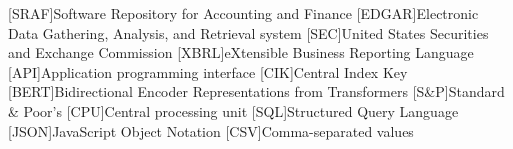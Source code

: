 \begin{acronym}[EDGAR]
    [SRAF]{Software Repository for Accounting and Finance}
    [EDGAR]{Electronic Data Gathering, Analysis, and Retrieval system}
    [SEC]{United States Securities and Exchange Commission}
    [XBRL]{eXtensible Business Reporting Language}
    [API]{Application programming interface}
    [CIK]{Central Index Key}
    [BERT]{Bidirectional Encoder Representations from Transformers}
    [S\&P]{Standard \& Poor’s}
    [CPU]{Central processing unit}
    [SQL]{Structured Query Language}
    [JSON]{JavaScript Object Notation}
    [CSV]{Comma-separated values}
\end{acronym}